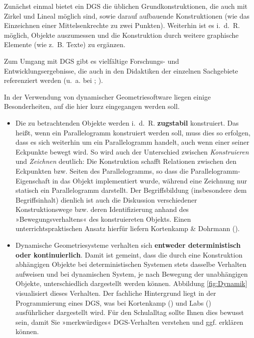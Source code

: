 \documentclass[
]{scrbook}
\providecommand{\tightlist}{%
  \setlength{\itemsep}{0pt}\setlength{\parskip}{0pt}}
\theoremstyle{definition}
\theoremstyle{definition}
\theoremstyle{definition}
\theoremstyle{definition}
\theoremstyle{remark}
\begin{document}
Zunächst einmal bietet ein DGS die üblichen Grundkonstruktionen, die auch mit Zirkel und Lineal möglich sind, sowie darauf aufbauende Konstruktionen (wie das Einzeichnen einer Mittelsenkrechte zu zwei Punkten). Weiterhin ist es i.~d.~R. möglich, Objekte auszumessen und die Konstruktion durch weitere graphische Elemente (wie z.~B. Texte) zu ergänzen.

Zum Umgang mit DGS gibt es vielfältige Forschungs- und Entwicklungsergebnisse, die auch in den Didaktiken der einzelnen Sachgebiete referenziert werden (u.~a. bei ; ).

In der Verwendung von dynamischer Geometriesoftware liegen einige Besonderheiten, auf die hier kurz eingegangen werden soll.

\begin{itemize}
\tightlist
\item
  Die zu betrachtenden Objekte werden i.~d.~R. \textbf{zugstabil} konstruiert. Das heißt, wenn ein Parallelogramm konstruiert werden soll, muss dies so erfolgen, dass es sich weiterhin um ein Parallelogramm handelt, auch wenn einer seiner Eckpunkte bewegt wird. So wird auch der Unterschied zwischen \emph{Konstruieren} und \emph{Zeichnen} deutlich: Die Konstruktion schafft Relationen zwischen den Eckpunkten bzw. Seiten des Parallelogramms, so dass die Parallelogramm-Eigenschaft in das Objekt implementiert wurde, während eine Zeichnung nur statisch ein Parallelogramm darstellt. Der Begriffsbildung (insbesondere dem Begriffsinhalt) dienlich ist auch die Diskussion verschiedener Konstruktionswege bzw. deren Identifizierung anhand des »Bewegungsverhaltens« des konstruiereten Objekts. Einen unterrichtspraktischen Ansatz hierfür liefern Kortenkamp \& Dohrmann ().
\end{itemize}

\begin{itemize}
\tightlist
\item
  Dynamische Geometriesysteme verhalten sich \textbf{entweder deterministisch oder kontinuierlich}. Damit ist gemeint, dass die durch eine Konstruktion abhängigen Objekte bei deterministischen Systemen stets dasselbe Verhalten aufweisen und bei dynamischen System, je nach Bewegung der unabhängigen Objekte, unterschiedlich dargestellt werden können. Abbildung \ref{fig:Dynamik} visualisiert dieses Verhalten. Der fachliche Hintergrund liegt in der Programmierung eines DGS, was bei Kortenkamp () und Labs () ausführlicher dargestellt wird. Für den Schulalltag sollte Ihnen dies bewusst sein, damit Sie »merkwürdiges« DGS-Verhalten verstehen und ggf. erklären können.
\end{itemize}
\end{document}
